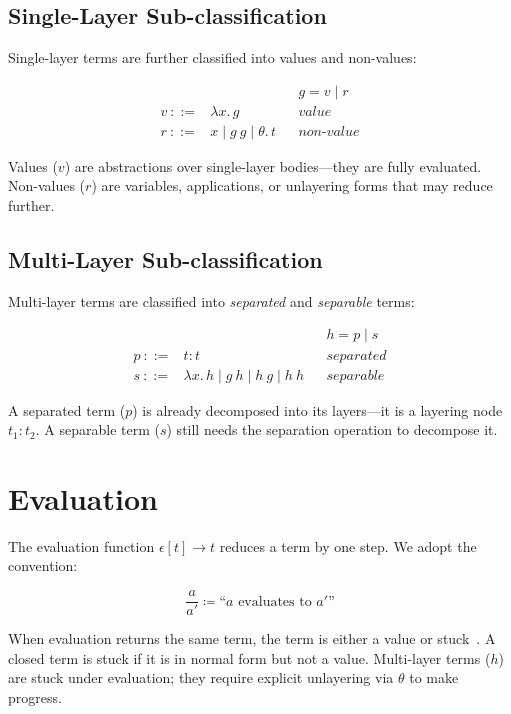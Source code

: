 \documentclass[11pt,letterpaper]{article}
\theoremstyle{definition}
\begin{document}
\subsection{Single-Layer Sub-classification}

Single-layer terms are further classified into values and non-values:

$$
\begin{array}{rcll}
  & & & g = v \mid r \\[4pt]
v \ ::= & \lambda x.\,g & & \textit{value} \\
r \ ::= & x \mid g\ g \mid \theta.\,t & & \textit{non-value}
\end{array}
$$

Values ($v$) are abstractions over single-layer bodies---they are fully
evaluated. Non-values ($r$) are variables, applications, or unlayering
forms that may reduce further.

\subsection{Multi-Layer Sub-classification}

Multi-layer terms are classified into \emph{separated} and \emph{separable}
terms:

$$
\begin{array}{rcll}
  & & & h = p \mid s \\[4pt]
p \ ::= & t{:}t & & \textit{separated} \\
s \ ::= & \lambda x.\,h \mid g\ h \mid h\ g \mid h\ h
  & & \textit{separable}
\end{array}
$$

A separated term ($p$) is already decomposed into its layers---it is a
layering node $t_1{:}t_2$. A separable term ($s$) still needs the separation
operation to decompose it.


\section{Evaluation}\label{sec:evaluation}

The evaluation function $\epsilon[t] \to t$ reduces a term by one step.
We adopt the convention:

$$
\dfrac{a}{a'} \coloneqq \text{``}a \text{ evaluates to } a'\text{''}
$$

When evaluation returns the same term, the term is either a value or
stuck~\cite{pierce2002}. A closed term is stuck if it is in normal form but
not a value. Multi-layer terms ($h$) are stuck under evaluation; they require
explicit unlayering via $\theta$ to make progress.
\end{document}
